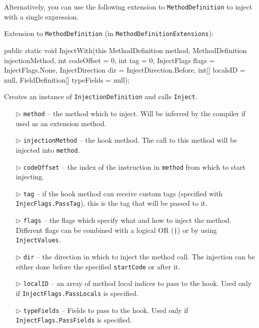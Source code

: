 \documentclass[a4paper,11pt]{article}
\begin{document}
Alternatively, you can use the following extension to \texttt{MethodDefinition} to inject with a single expression.

\begin{mdef}
Extension to \texttt{MethodDefinition} (in \texttt{MethodDefinitionExtensions}):
\begin{cs}
public static void InjectWith(this MethodDefinition method,
                        MethodDefinition injectionMethod,
                        int codeOffset = 0,
                        int tag = 0,
                        InjectFlags flags = InjectFlags.None,
                        InjectDirection dir = InjectDirection.Before,
                        int[] localsID = null,
                        FieldDefinition[] typeFields = null);
\end{cs}

Creates an instance of \texttt{InjectionDefinition} and calls \texttt{Inject}.

\begin{itemize}
\item[$\triangleright$] \texttt{method} -- the method which to inject. Will be inferred by the compiler if used as an extension method.
\item[$\triangleright$] \texttt{injectionMethod} -- the hook method. The call to this method will be injected into \texttt{method}.
\item[$\triangleright$] \texttt{codeOffset} -- the index of the instruction in \texttt{method} from which to start injecting.
\item[$\triangleright$] \texttt{tag} -- if the hook method can receive custom tags (specified with \texttt{InjecFlags.PassTag}), this is the tag that will be passed to it.
\item[$\triangleright$] \texttt{flags} -- the flags which specify what and how to inject the method. Different flags can be combined with a logical OR (\texttt{|}) or by using \texttt{InjectValues}.
\item[$\triangleright$] \texttt{dir} -- the direction in which to inject the method call. The injection can be either done before the specified \texttt{startCode} or after it.
\item[$\triangleright$] \texttt{localID} -- an array of method local indices to pass to the hook. Used only if \texttt{InjectFlags.PassLocals} is specified.
\item[$\triangleright$] \texttt{typeFields} -- Fields to pass to the hook. Used only if \texttt{InjectFlags.PassFields} is specified.
\end{itemize}


\end{mdef}
\end{document}
